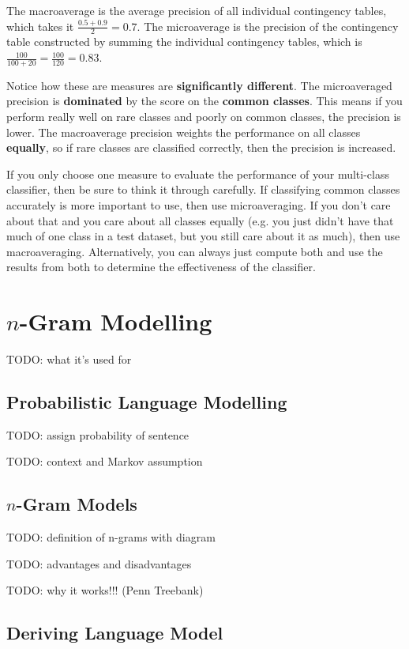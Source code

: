 \documentclass{article}
\begin{document}
The macroaverage is the average precision of all individual contingency tables, which takes it $\frac{0.5 + 0.9}{2} = 0.7$. The microaverage is the precision of the contingency table constructed by summing the individual contingency tables, which is $\frac{100}{100 + 20} = \frac{100}{120} = 0.83$.

Notice how these are measures are \textbf{significantly different}. The microaveraged precision is \textbf{dominated} by the score on the \textbf{common classes}. This means if you perform really well on rare classes and poorly on common classes, the precision is lower. The macroaverage precision weights the performance on all classes \textbf{equally}, so if rare classes are classified correctly, then the precision is increased.

If you only choose one measure to evaluate the performance of your multi-class classifier, then be sure to think it through carefully. If classifying common classes accurately is more important to use, then use microaveraging. If you don't care about that and you care about all classes equally (e.g. you just didn't have that much of one class in a test dataset, but you still care about it as much), then use macroaveraging. Alternatively, you can always just compute both and use the results from both to determine the effectiveness of the classifier.

\section{$n$-Gram Modelling}

TODO: what it's used for

\subsection{Probabilistic Language Modelling}

TODO: assign probability of sentence

TODO: context and Markov assumption

\subsection{$n$-Gram Models}

TODO: definition of n-grams with diagram

TODO: advantages and disadvantages

TODO: why it works!!! (Penn Treebank)

\subsection{Deriving Language Model}
\end{document}
